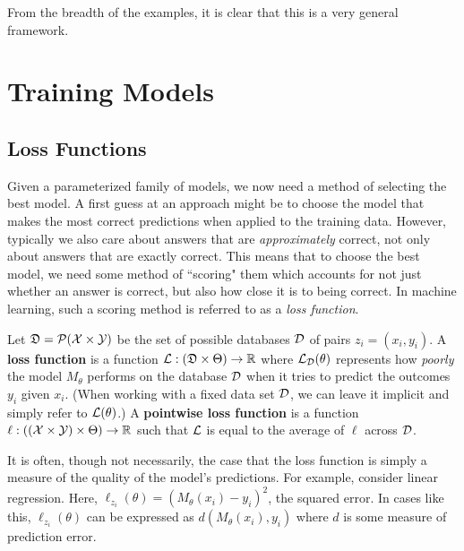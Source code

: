 \documentclass[12pt,twoside]{reedthesis}
\begin{document}
From the breadth of the examples, it is clear that this is a very general framework. %

\section{Training Models}
\subsection{Loss Functions}
Given a parameterized family of models, we now need a method of selecting the best model. A first guess at an approach might be to choose the model that makes the most correct predictions when applied to the training data. However, typically we also care about answers that are \textit{approximately} correct, not only about answers that are exactly correct. This means that to choose the best model, we need some method of ``scoring" them which accounts for not just whether an answer is correct, but also how close it is to being correct. In machine learning, such a scoring method is referred to as a \textit{loss function}.

\begin{definition}
    Let $\mathfrak{D} = \mathcal{P}(\mathcal{X} \times \mathcal{Y})$ be the set of possible databases $\mathcal{D}$ of pairs $z_i = (x_i, y_i)$. A \textbf{loss function} is a function $\cl{L}: (\fk{D} \times \Theta) \to \R$ where $\mathcal{L}_{\mathcal{D}}(\theta)$ represents how \textit{poorly} the model $M_\theta$ performs on the database $\mathcal{D}$ when it tries to predict the outcomes $y_i$ given $x_i$. (When working with a fixed data set $\mathcal{D}$, we can leave it implicit and simply refer to $\mathcal{L}(\theta)$.) A \textbf{pointwise loss function} is a function $\ell: ((\cl{X} \times \cl{Y}) \times \Theta) \to \R$ such that $\mathcal{L}$ is equal to the average of $\ell$ across $\mathcal{D}$.
\end{definition}

It is often, though not necessarily, the case that the loss function is simply a measure of the quality of the model's predictions. For example, consider linear regression. Here, $\ell_{z_i}(\theta) = (M_\theta(x_i) - y_i)^2$, the squared error. In cases like this, $\ell_{z_i}(\theta)$ can be expressed as $d(M_{\theta}(x_i), y_i)$ where $d$ is some measure of prediction error.
\end{document}
